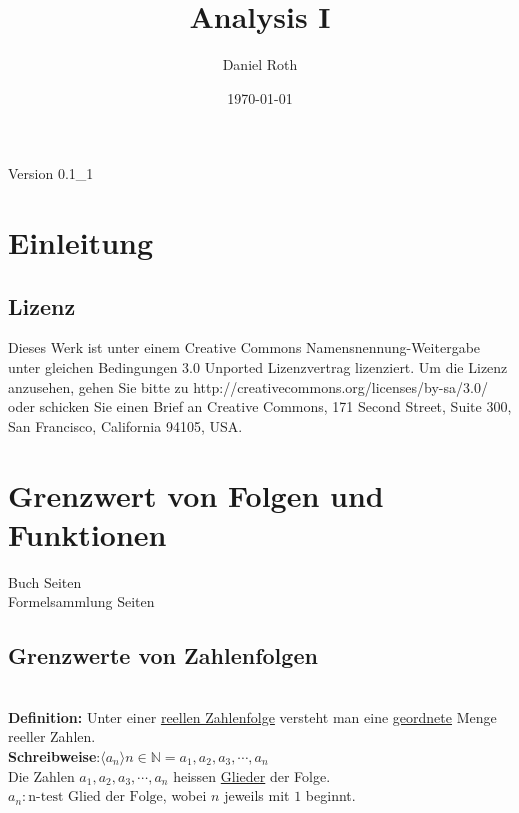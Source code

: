 \documentclass[11pt]{amsart}
\title{Analysis I}
\author{Daniel Roth}
\date{\today}
\theoremstyle{remark}
\begin{document}
\begin{titlepage}
\maketitle
\begin{table}[b]
\begin{center}
Version 0.1\_1
\end{center}
\end{table}
\end{titlepage}

\tableofcontents
\newpage
\section{Einleitung}
\subsection{Lizenz}
Dieses Werk ist unter einem Creative Commons Namensnennung-Weitergabe unter gleichen Bedingungen 3.0 Unported Lizenzvertrag lizenziert. Um die Lizenz anzusehen, gehen Sie bitte zu http://creativecommons.org/licenses/by-sa/3.0/ oder schicken Sie einen Brief an Creative Commons, 171 Second Street, Suite 300, San Francisco, California 94105, USA.

\section{Grenzwert von Folgen und Funktionen}
Buch Seiten
\\Formelsammlung Seiten
\subsection{Grenzwerte von Zahlenfolgen}
\textbf{ \\Definition:} Unter einer \underline{reellen Zahlenfolge} versteht man eine \underline{geordnete} Menge reeller Zahlen.\\
\textbf{Schreibweise}:$\langle a_n\rangle n\in\mathbb{N}= a_1, a_2, a_3, \dotsb, a_n$\\
Die Zahlen $a_1,a_2,a_3, \dotsb , a_n$ heissen \underline{Glieder} der Folge. \\$a_n : \text{n-test Glied der Folge}$, wobei $n$ jeweils mit $1$ beginnt.
\end{document}
